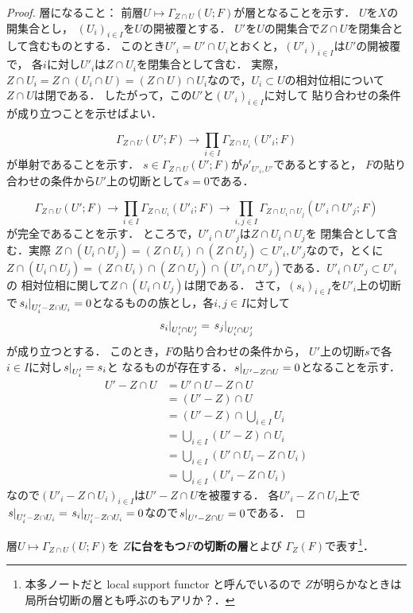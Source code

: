 \begin{proof}
    層になること：
    前層\(U\mapsto\Gamma_{Z\cap U}(U;F)\)が層となることを示す．
    \(U\)を\(X\)の開集合とし，
    \(\left(U_i\right)_{i\in I}\)を\(U\)の開被覆とする．
    \(U'\)を\(U\)の開集合で\(Z\cap U\)を閉集合として含むものとする．
    このとき\(U'_i=U'\cap U_i\)とおくと，\(
        \left(U'_i\right)_{i\in I}
    \)は\(U'\)の開被覆で，
    各\(i\)に対し\(U'_i\)は\(Z\cap U_i\)を閉集合として含む．
    実際，\(
        Z\cap U_i=Z\cap (U_i\cap U)=(Z\cap U)\cap U_i
    \)なので，\(U_i\subset U\)の相対位相について\(Z\cap U\)は閉である．
    したがって，この\(U'\)と\(\left(U'_i\right)_{i\in I}\)に対して
    貼り合わせの条件が成り立つことを示せばよい．

    \[
        \Gamma_{Z\cap U}(U';F)
        \to \prod_{i\in I}\Gamma_{Z\cap U_i}(U'_i;F)
    \]が単射であることを示す．
    \(s\in\Gamma_{Z\cap U}(U';F)\)が\(\rho'_{U'_i,U'}\)であるとすると，
    \(F\)の貼り合わせの条件から\(U'\)上の切断として\(s=0\)である．

    \[
        \Gamma_{Z\cap U}(U';F)
        \to \prod_{i\in I}\Gamma_{Z\cap U_i}(U'_i;F)
        \to \prod_{i,j\in I}
        \Gamma_{Z\cap U_i\cap U_j}(U'_i\cap U'_j;F)
    \]が完全であることを示す．
    ところで，\(U'_i\cap U'_j\)は\(Z\cap U_i\cap U_j\)を
    閉集合として含む．実際
    \(
        Z\cap(U_i\cap U_j)
        =(Z\cap U_i)\cap (Z\cap U_j)
        \subset U'_i, U'_j
    \)なので，とくに\(
        Z\cap(U_i\cap U_j)
        =(Z\cap U_i)\cap (Z\cap U_j)\cap (U'_i\cap U'_j)
    \)である．\(U'_i\cap U'_j\subset U'_i\)の
    相対位相に関して\(Z\cap(U_i\cap U_j)\)は閉である．
    さて，\(\left(s_i\right)_{i\in I}\)を\(U'_i\)上の切断で\(
        \mres[s_i]{U'_i-Z\cap U_i}=0
    \)となるものの族とし，各\(i,j\in I\)に対して\[
        \mres[s_i]{U'_i\cap U'_j}=
        \mres[s_j]{U'_i\cap U'_j}
    \]が成り立つとする．
    このとき，\(F\)の貼り合わせの条件から，
    \(U'\)上の切断\(s\)で各\(i\in I\)に対し\(\mres[s]{U'_i}=s_i\)と
    なるものが存在する．\(\mres[s]{U'-Z\cap U}=0\)となることを示す．
    \begin{align*}
        U'-Z\cap U
        &=U'\cap U- Z\cap U\\
        &=(U'- Z)\cap U\\
        &=(U'- Z)\cap \bigcup_{i\in I}U_i\\
        &=\bigcup_{i\in I} (U'- Z)\cap U_i\\
        &=\bigcup_{i\in I} (U'\cap U_i- Z\cap U_i)\\
        &=\bigcup_{i\in I} (U'_i- Z\cap U_i)
    \end{align*}
    なので\(\left(U'_i-Z\cap U_i\right)_{i\in I}\)は\(U'-Z\cap U\)を被覆する．
    各\(U'_i-Z\cap U_i\)上で\(
        \mres[s]{U'_i-Z\cap U_i}=\mres[s_i]{U'_i-Z\cap U_i}=0
    \)なので\(\mres[s]{U'-Z\cap U}=0\)である．
\end{proof}
\begin{DFN}
    層\(U\mapsto\Gamma_{Z\cap U}(U;F)\)を
    \textbf{\(Z\)に台をもつ\(F\)の切断の層}とよび
    \(\Gamma_Z(F)\)で表す\footnote{
        本多ノートだと local support functor と呼んでいるので
        \(Z\)が明らかなときは局所台切断の層とも呼ぶのもアリか？．
    }．
\end{DFN}

